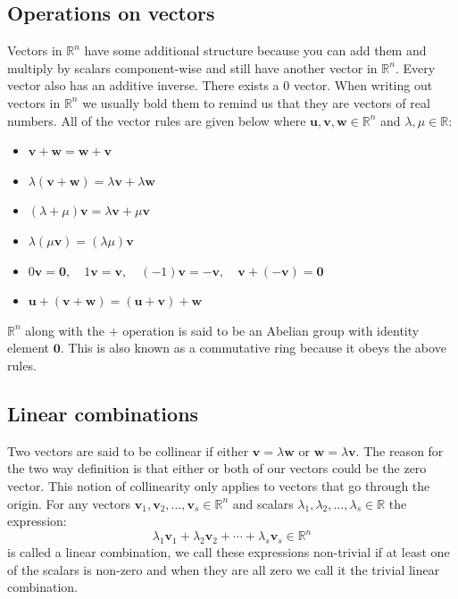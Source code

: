 \documentclass[12pt]{article}
\begin{document}
\subsection*{Operations on vectors}
Vectors in \(\mathbb{R}^n\) have some additional structure because you can add them and multiply by scalars component-wise and still have another vector in \(\mathbb{R}^n\). Every vector also has an additive inverse. There exists a 0 vector. When writing out vectors in \(\mathbb{R}^n\) we usually bold them to remind us that they are vectors of real numbers. All of the vector rules are given below where \(\textbf{u},\textbf{v},\textbf{w}\in\mathbb{R}^n\) and \(\lambda,\mu\in\mathbb{R}\):
\begin{itemize}
    \item \(\textbf{v}+\textbf{w}=\textbf{w}+\textbf{v}\)
    \item \(\lambda(\textbf{v}+\textbf{w})=\lambda\textbf{v}+\lambda\textbf{w}\)
    \item \((\lambda+\mu)\textbf{v}=\lambda\textbf{v}+\mu\textbf{v}\)
    \item \(\lambda(\mu\textbf{v})=(\lambda\mu)\textbf{v}\)
    \item \(0\textbf{v}=\textbf{0},\quad 1\textbf{v}=\textbf{v},\quad(-1)\textbf{v}=-\textbf{v},\quad \textbf{v}+(-\textbf{v})=\textbf{0}\)
    \item \(\textbf{u}+(\textbf{v}+\textbf{w})=(\textbf{u}+\textbf{v})+\textbf{w}\)
\end{itemize}
\(\mathbb{R}^n\) along with the \(+\) operation is said to be an Abelian group with identity element \(\textbf{0}\). This is also known as a commutative ring because it obeys the above rules.
\subsection*{Linear combinations}
Two vectors are said to be collinear if either \(\textbf{v}=\lambda\textbf{w}\) or \(\textbf{w}=\lambda\textbf{v}\). The reason for the two way definition is that either or both of our vectors could be the zero vector. This notion of collinearity only applies to vectors that go through the origin. For any vectors \(\textbf{v}_1,\textbf{v}_2,\dots,\textbf{v}_s\in\mathbb{R}^n\) and scalars \(\lambda_1,\lambda_2,\dots,\lambda_s\in\mathbb{R}\) the expression:
\[\lambda_1\textbf{v}_1+\lambda_2\textbf{v}_2+\cdots+\lambda_s\textbf{v}_s\in\mathbb{R}^n\]
is called a linear combination, we call these expressions non-trivial if at least one of the scalars is non-zero and when they are all zero we call it the trivial linear combination.
\end{document}
